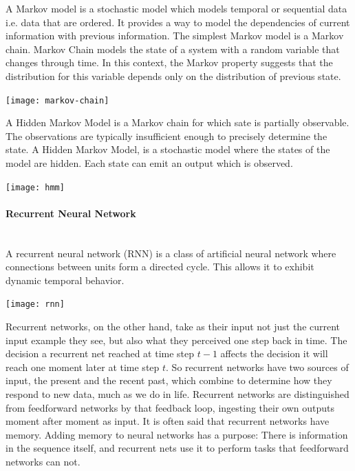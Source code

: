 A Markov model is a stochastic model which models temporal or sequential data i.e. data that are ordered. It provides a 
way to model the dependencies of current information with previous information. The simplest Markov model is a Markov chain.
Markov Chain models the state of a system with a random variable that changes through time. In this context, the Markov property suggests that the distribution for this variable depends only on the distribution of previous state. 

\begin{minipage}{\linewidth}
	\centering
	\texttt{[image: markov-chain]} 
\end{minipage}	

A Hidden Markov Model is a Markov chain for which sate is partially observable. The observations are typically insufficient enough to precisely determine the state. A Hidden Markov Model, is a stochastic model where the states of the model are hidden. Each state can emit an output which is observed.

\begin{minipage}{\linewidth}
	\centering
	\texttt{[image: hmm]} 
\end{minipage}	

\paragraph{Recurrent Neural Network} \mbox{}\\

A recurrent neural network (RNN) is a class of artificial neural network where connections between units form a directed cycle. This allows it to exhibit dynamic temporal behavior.

\begin{minipage}{\linewidth}
	\centering
	\texttt{[image: rnn]} 
\end{minipage}	

Recurrent networks, on the other hand, take as their input not just the current input example they see, but also what they perceived one step back in time. The decision a recurrent net reached at time step $t-1$ affects the decision it will reach one moment later at time step $t$. So recurrent networks have two sources of input, the present and the recent past, which combine to determine how they respond to new data, much as we do in life. Recurrent networks are distinguished from feedforward networks by that feedback loop, ingesting their own outputs moment after moment as input. It is often said that recurrent networks have memory. Adding memory to neural networks has a purpose: There is information in the sequence itself, and recurrent nets use it to perform tasks that feedforward networks can not.

